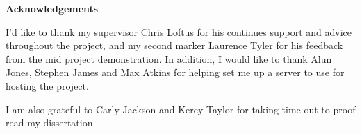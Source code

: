 \thispagestyle{empty}

\begin{center}
    {\LARGE\bf Acknowledgements}
\end{center}

I'd like to thank my supervisor Chris Loftus for his continues support and advice throughout the project, and my second marker Laurence Tyler for his feedback from the mid project demonstration. In addition, I would like to thank Alun Jones, Stephen James and Max Atkins for helping set me up a server to use for hosting the project.

I am also grateful to Carly Jackson and Kerey Taylor for taking time out to proof read my dissertation.
